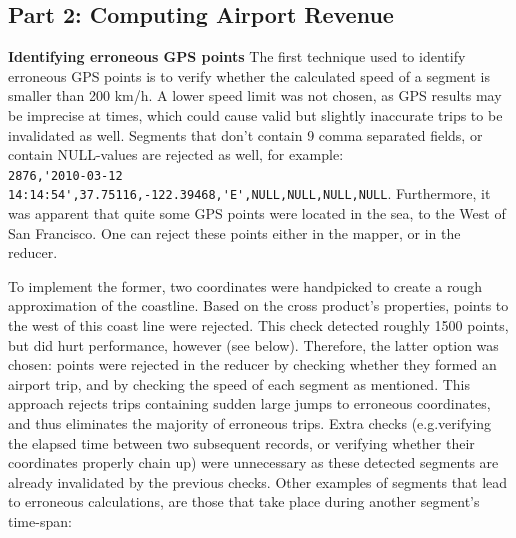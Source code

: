 \documentclass[11pt]{article}
\begin{document}
\vspace{-.3cm}
\subsection*{Part 2: Computing Airport Revenue}

\textbf{Identifying erroneous GPS points}
The first technique used to identify erroneous GPS points is to verify whether the calculated speed of a segment is smaller than 200 km/h. A lower speed limit was not chosen, as GPS results may be imprecise at times, which could cause valid but slightly inaccurate trips to be invalidated as well. Segments that don't contain 9 comma separated fields, or contain NULL-values are rejected as well, for example: \\
\hspace{-2cm}\verb|2876,'2010-03-12 14:14:54',37.75116,-122.39468,'E',NULL,NULL,NULL,NULL|.
Furthermore, it was apparent that quite some GPS points were located in the sea, to the West of San Francisco. One can reject these points either in the mapper, or in the reducer. 



To implement the former, two coordinates were handpicked to create a rough approximation of the coastline. Based on the cross product's properties, points to the west of this coast line were rejected. This check detected roughly 1500 points, but did hurt performance, however (see below). Therefore, the latter option was chosen: points were rejected in the reducer by checking whether they formed an airport trip, and by checking the speed of each segment as mentioned. This approach rejects trips containing sudden large jumps to erroneous coordinates, and thus eliminates the majority of erroneous trips.
Extra checks (e.g.verifying the elapsed time between two subsequent records, or verifying whether their coordinates properly chain up) were unnecessary as these detected segments are already invalidated by the previous checks. Other examples of segments that lead to erroneous calculations, are those that take place during another segment's time-span:
\end{document}
